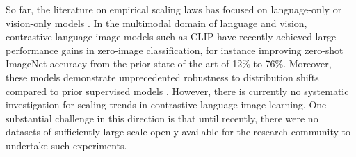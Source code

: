 \documentclass[11pt,table]{article}
\newcommand{\citep}{\cite}
\begin{document}
So far, the literature on empirical scaling laws has focused on language-only \citep{Kaplan2020,tay2021scale,hoffmann2022training} or vision-only models \citep{Zhai2022scaling,Henighan2020,Riquelme2021}.
In the multimodal domain of language and vision, contrastive language-image models such as CLIP \citep{radford2021learning} have recently achieved large performance gains in zero-image classification, for instance improving zero-shot ImageNet accuracy from the prior state-of-the-art of 12\% to 76\%.
Moreover, these models demonstrate unprecedented robustness to distribution shifts compared to prior supervised models \citep{Taori2020, radford2021learning, wortsman2022robust}.
However, there is currently no systematic investigation for scaling trends in contrastive language-image learning.
One substantial challenge in this direction is that until recently, there were no datasets of sufficiently large scale openly available for the research community to undertake such experiments.

\end{document}
